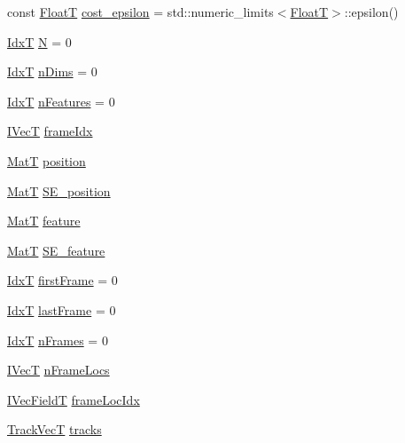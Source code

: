 \begin{DoxyCompactItemize}
\item 
const \hyperlink{classtracker_1_1Tracker_a66e8a81f12871e23082264c964f8f103}{FloatT} \hyperlink{classtracker_1_1LAPTrack_a7e64b62f96af123e349ce5ba7801cced}{cost\+\_\+epsilon} = std\+::numeric\+\_\+limits$<$\hyperlink{classtracker_1_1Tracker_a66e8a81f12871e23082264c964f8f103}{FloatT}$>$\+::epsilon()
\item 
\hyperlink{classtracker_1_1Tracker_ad39a875dc6957cb6a9f3affcf6517d80}{IdxT} \hyperlink{classtracker_1_1Tracker_a5d8cb7831463035649c791311001228f}{N} = 0
\item 
\hyperlink{classtracker_1_1Tracker_ad39a875dc6957cb6a9f3affcf6517d80}{IdxT} \hyperlink{classtracker_1_1Tracker_a5efb17589760984816411fb6f69d561d}{n\+Dims} = 0
\item 
\hyperlink{classtracker_1_1Tracker_ad39a875dc6957cb6a9f3affcf6517d80}{IdxT} \hyperlink{classtracker_1_1Tracker_ade0b77f0b5ffc71aecddc70593ec16bb}{n\+Features} = 0
\item 
\hyperlink{classtracker_1_1Tracker_a59a6e01be987f9c0093a8ac5ad97ce33}{I\+VecT} \hyperlink{classtracker_1_1Tracker_aa3e32ff8183fe70af1d351f6324e7615}{frame\+Idx}
\item 
\hyperlink{classtracker_1_1Tracker_a60a1d6ee07284ba82f0533c79311ccfd}{MatT} \hyperlink{classtracker_1_1Tracker_a89978ed5ec72607820f45f3dcf63dd04}{position}
\item 
\hyperlink{classtracker_1_1Tracker_a60a1d6ee07284ba82f0533c79311ccfd}{MatT} \hyperlink{classtracker_1_1Tracker_acd4e8651a05dff9170230149b7fe0029}{S\+E\+\_\+position}
\item 
\hyperlink{classtracker_1_1Tracker_a60a1d6ee07284ba82f0533c79311ccfd}{MatT} \hyperlink{classtracker_1_1Tracker_ab9d6c09e4ae84ff482cd21cc32878138}{feature}
\item 
\hyperlink{classtracker_1_1Tracker_a60a1d6ee07284ba82f0533c79311ccfd}{MatT} \hyperlink{classtracker_1_1Tracker_a0aa2719b06bfd7b630628486b67ca5fd}{S\+E\+\_\+feature}
\item 
\hyperlink{classtracker_1_1Tracker_ad39a875dc6957cb6a9f3affcf6517d80}{IdxT} \hyperlink{classtracker_1_1Tracker_a3ba78a0a502bd2ac432601fc204e3ba1}{first\+Frame} = 0
\item 
\hyperlink{classtracker_1_1Tracker_ad39a875dc6957cb6a9f3affcf6517d80}{IdxT} \hyperlink{classtracker_1_1Tracker_af3219a1e02551ca5c6aafc4a8c14ff30}{last\+Frame} = 0
\item 
\hyperlink{classtracker_1_1Tracker_ad39a875dc6957cb6a9f3affcf6517d80}{IdxT} \hyperlink{classtracker_1_1Tracker_a103afa608ae5693103d81e040a9e29d6}{n\+Frames} = 0
\item 
\hyperlink{classtracker_1_1Tracker_a59a6e01be987f9c0093a8ac5ad97ce33}{I\+VecT} \hyperlink{classtracker_1_1Tracker_a84d3000b7a2b7a2566791f05d3b8afcb}{n\+Frame\+Locs}
\item 
\hyperlink{classtracker_1_1Tracker_a122e1d351fcb4444aec9729cf7625322}{I\+Vec\+FieldT} \hyperlink{classtracker_1_1Tracker_a089a3af55a168691f56d856658786159}{frame\+Loc\+Idx}
\item 
\hyperlink{classtracker_1_1Tracker_a25ee8479eb10f1619a8eefd5d310eeb7}{Track\+VecT} \hyperlink{classtracker_1_1Tracker_a1e43335eb50e56014399a157b261160b}{tracks}
\end{DoxyCompactItemize}
